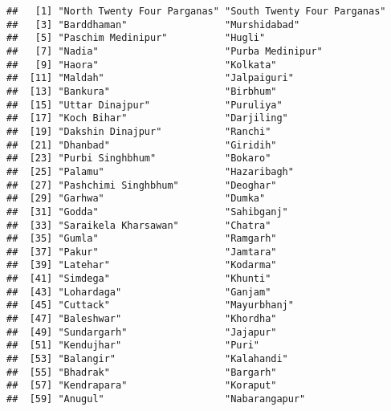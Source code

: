 \documentclass[]{article}
\newenvironment{Shaded}{\begin{snugshade}}{\end{snugshade}}
\newcommand{\KeywordTok}[1]{\textcolor[rgb]{0.13,0.29,0.53}{\textbf{#1}}}
\newcommand{\DecValTok}[1]{\textcolor[rgb]{0.00,0.00,0.81}{#1}}
\newcommand{\StringTok}[1]{\textcolor[rgb]{0.31,0.60,0.02}{#1}}
\newcommand{\OperatorTok}[1]{\textcolor[rgb]{0.81,0.36,0.00}{\textbf{#1}}}
\newcommand{\NormalTok}[1]{#1}
\begin{document}
\begin{Shaded}
\end{Shaded}

\begin{verbatim}
##   [1] "North Twenty Four Parganas" "South Twenty Four Parganas"
##   [3] "Barddhaman"                 "Murshidabad"               
##   [5] "Paschim Medinipur"          "Hugli"                     
##   [7] "Nadia"                      "Purba Medinipur"           
##   [9] "Haora"                      "Kolkata"                   
##  [11] "Maldah"                     "Jalpaiguri"                
##  [13] "Bankura"                    "Birbhum"                   
##  [15] "Uttar Dinajpur"             "Puruliya"                  
##  [17] "Koch Bihar"                 "Darjiling"                 
##  [19] "Dakshin Dinajpur"           "Ranchi"                    
##  [21] "Dhanbad"                    "Giridih"                   
##  [23] "Purbi Singhbhum"            "Bokaro"                    
##  [25] "Palamu"                     "Hazaribagh"                
##  [27] "Pashchimi Singhbhum"        "Deoghar"                   
##  [29] "Garhwa"                     "Dumka"                     
##  [31] "Godda"                      "Sahibganj"                 
##  [33] "Saraikela Kharsawan"        "Chatra"                    
##  [35] "Gumla"                      "Ramgarh"                   
##  [37] "Pakur"                      "Jamtara"                   
##  [39] "Latehar"                    "Kodarma"                   
##  [41] "Simdega"                    "Khunti"                    
##  [43] "Lohardaga"                  "Ganjam"                    
##  [45] "Cuttack"                    "Mayurbhanj"                
##  [47] "Baleshwar"                  "Khordha"                   
##  [49] "Sundargarh"                 "Jajapur"                   
##  [51] "Kendujhar"                  "Puri"                      
##  [53] "Balangir"                   "Kalahandi"                 
##  [55] "Bhadrak"                    "Bargarh"                   
##  [57] "Kendrapara"                 "Koraput"                   
##  [59] "Anugul"                     "Nabarangapur"              

\end{verbatim}
\end{document}
